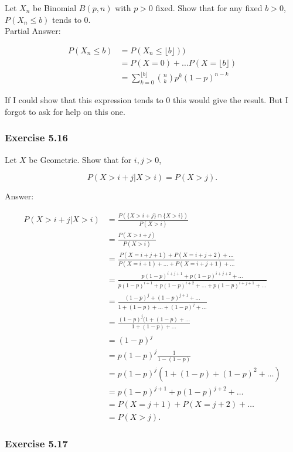 \documentclass{article}
\begin{document}
{Let $X_n$ be Binomial $B(p, n)$ with $p > 0$ fixed. Show that for any fixed $b > 0$, $P(X_n \leq b)$ tends to 0.\\

Partial Answer: 

\begin{align*}
P(X_n \leq b) &= P(X_n \leq \lfloor b \rfloor)) \\
&= P(X = 0) + \dots P(X = \lfloor b \rfloor) \\
&= \sum_{k=0}^{\lfloor b \rfloor} \binom{n}{k} p^k (1-p)^{n-k}
\end{align*}

If I could show that this expression tends to 0 this would give the result. But I forgot to ask for help on this one. 


\subsubsection*{Exercise 5.16}

Let $X$ be Geometric. Show that for $i,j > 0$,

$$
P(X > i+j \vert  X > i) = P(X > j).
$$

Answer:

\begin{align*}
P(X > i+j \vert  X > i)
&= \frac{P(\{X > i+j\} \cap \{X > i\})}{P(X > i)} \\
&= \frac{P(X > i+j)}{P(X > i)} \\
&= \frac{P(X = i+j+1) + P(X = i+j + 2) + \dots }{P(X = i+1) + \dots +P(X = i+j+1) + \dots} \\
&= \frac{p(1-p)^{i+j+1} + p(1-p)^{i+j+2} + \dots }{p(1-p)^{i+1} + p(1-p)^{i+2} + \dots + p(1-p)^{i+j+1} + \dots}\\
&= \frac{(1-p)^j + (1-p)^{j+1} + \dots}{1 + (1-p) + \dots +(1-p)^j + \dots } \\
&= \frac{(1-p)^j(1 + (1-p) + \dots }{1 + (1-p) + \dots } \\
&= (1-p)^j \\
&= p(1-p)^j \frac{1}{1-(1-p)} \\
&= p(1-p)^j(1 + (1-p) + (1-p)^2 + \dots ) \\
&= p(1-p)^{j+1} + p(1-p)^{j+2} + \dots \\
&= P(X = j+1) + P(X = j+2) + \dots \\
&= P(X > j).
\end{align*}

\subsubsection*{Exercise 5.17}

}
\end{document}
